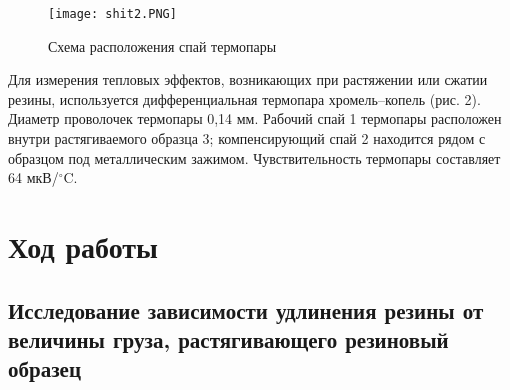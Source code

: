 \documentclass[a4paper]{article}
\begin{document}
\begin{figure}[t]
    \centering
    \texttt{[image: shit2.PNG]}
    \caption{Схема расположения спай термопары}
    \label{fig:vac}
\end{figure}

Для измерения тепловых эффектов, возникающих при растяжении или сжатии резины, используется дифференциальная термопара хромель–копель (рис. 2). Диаметр проволочек термопары 0,14 мм. Рабочий спай 1 термопары расположен внутри растягиваемого образца 3; компенсирующий спай 2 находится рядом с образцом под металлическим зажимом. Чувствительность термопары составляет
64 мкВ/$^\circ$C.

\section{Ход работы}

\subsection{Исследование зависимости удлинения резины от величины груза, растягивающего резиновый образец}
\end{document}
